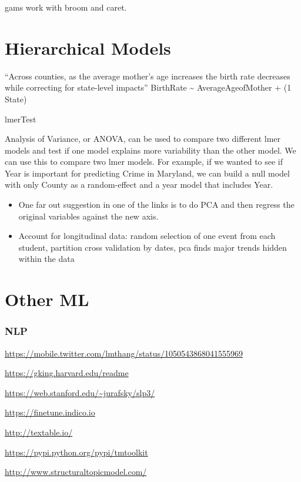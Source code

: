 \documentclass[]{book}
\begin{document}
gams work with broom and caret.

\section{Hierarchical Models}\label{hierarchical-models}

``Across counties, as the average mother's age increases the birth rate
decreases while correcting for state-level impacts'' BirthRate
\textasciitilde{} AverageAgeofMother + (1 \textbar{} State)

lmerTest

Analysis of Variance, or ANOVA, can be used to compare two different
lmer models and test if one model explains more variability than the
other model. We can use this to compare two lmer models. For example, if
we wanted to see if Year is important for predicting Crime in Maryland,
we can build a null model with only County as a random-effect and a year
model that includes Year.

\begin{itemize}
\item
  One far out suggestion in one of the links is to do PCA and then
  regress the original variables against the new axis.
\item
  Account for longitudinal data: random selection of one event from each
  student, partition cross validation by dates, pca finds major trends
  hidden within the data
\end{itemize}

\section{Other ML}\label{other-ml}

\subsubsection{NLP}\label{nlp}

\url{https://mobile.twitter.com/lmthang/status/1050543868041555969}

\url{https://gking.harvard.edu/readme}

\url{https://web.stanford.edu/~jurafsky/slp3/}

\url{https://finetune.indico.io}

\url{http://textable.io/}

\url{https://pypi.python.org/pypi/tmtoolkit}

\url{http://www.structuraltopicmodel.com/}
\end{document}
